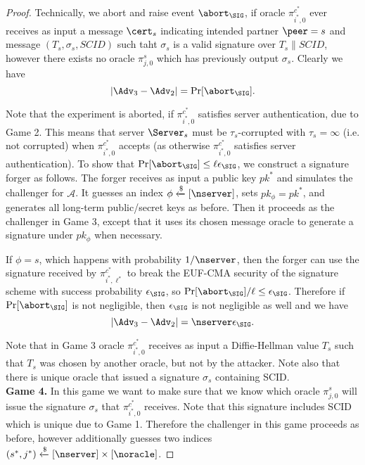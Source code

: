 \begin{proof}
 Technically, we abort and raise event $\abort_\SIG$, if oracle $\pi^{c^{\ast}}_{i^{\ast},0}$ ever receives as input a message $\cert_s$ indicating intended partner $\peer = s$ and message $(T_s,\sigma_s,SCID)$ such taht $\sigma_s$ is a valid signature over $T_s\|SCID$, however there exists no oracle $\pi^s_{j,0}$ which has previously output $\sigma_s$. Clearly we have
 \begin{equation}
  |\Adv_3 - \Adv_2| = \Pr[\abort_{\SIG}].
 \end{equation}%

 Note that the experiment is aborted, if $\pi^{c^{\ast}}_{i^{\ast},0}$ satisfies server authentication, due to Game 2. This means that server $\Server_s$ must be $\tau_s$-corrupted with $\tau_s = \infty$ (i.e. not corrupted) when $\pi^{c^{\ast}}_{i^{\ast},0}$ accepts (as otherwise $\pi^{c^{\ast}}_{i^{\ast},0}$ satisfies server authentication). To show that $\Pr[\abort_{\SIG}] \leq \ell \epsilon_{\SIG}$, we construct a signature forger as follows. The forger receives as input a public key $pk^{\ast}$ and simulates the challenger for $\mathcal{A}$. It guesses an index $\phi \xleftarrow{\$}[\nserver]$, sets $pk_{\phi} = pk^{\ast}$, and generates all long-term public/secret keys as before. Then it proceeds as the challenger in Game 3, except that it uses its chosen message oracle to generate a signature under $pk_{\phi}$ when necessary.

 If $\phi = s$, which happens with probability $1/\nserver$, then the forger can use the signature received by $\pi^{c^{\ast}}_{i^{\ast},\ell^{\ast}}$ to break the EUF-CMA security of the signature scheme with success probability $\epsilon_{\SIG}$, so $\Pr[\abort_{\SIG}]/\ell \leq \epsilon_{\SIG}$. Therefore if $\Pr[\abort_{\SIG}]$ is not negligible, then $\epsilon_{\SIG}$ is not negligible as well and we have
 \begin{equation}
  |\Adv_3 - \Adv_2| = \nserver \epsilon_{\SIG}.
 \end{equation}%

 Note that in Game 3 oracle $\pi^{c^{\ast}}_{i^{\ast},0}$ receives as input a Diffie-Hellman value $T_s$ such that $T_s$ was chosen by another oracle, but not by the attacker. Note also that there is unique oracle that issued a signature $\sigma_s$ containing SCID.
\vspace{10pt}\\%
%
%
 \textbf{Game 4.} In this game we want to make sure that we know which oracle $\pi^s_{j,0}$ will issue the signature $\sigma_s$ that $\pi^{c^{\ast}}_{i^{\ast},0}$ receives. Note that this signature includes SCID which is unique due to Game 1. Therefore the challenger in this game proceeds as before, however additionally guesses two indices $(s^{\ast}, j^{\ast}) \xleftarrow{\$} [\nserver] \times [\noracle]$.


\end{proof}
